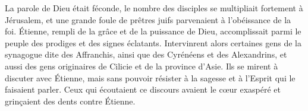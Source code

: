 La parole de Dieu était féconde,
	le nombre des disciples se multipliait fortement à Jérusalem,
	et une grande foule de prêtres juifs parvenaient à l’obéissance de la foi.
Étienne, rempli de la grâce et de la puissance de Dieu,
	accomplissait parmi le peuple des prodiges et des signes éclatants.
Intervinrent alors certaines gens de la synagogue dite des Affranchis,
	ainsi que des Cyrénéens et des Alexandrins,
	et aussi des gens originaires de Cilicie et de la province d’Asie.
Ils se mirent à discuter avec Étienne,
	mais sans pouvoir résister à la sagesse et à l’Esprit
		qui le faisaient parler.
Ceux qui écoutaient ce discours avaient le cœur exaspéré
	et grinçaient des dents contre Étienne.

